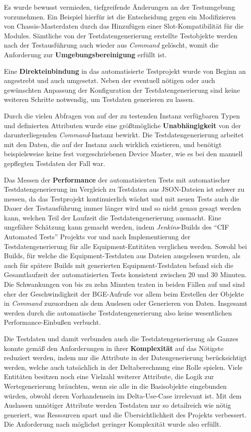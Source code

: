 Es wurde bewusst vermieden, tiefgreifende Änderungen an der Testumgebung vorzunehmen. Ein Beispiel hierfür ist die Entscheidung gegen ein Modifizieren von Chassis-Masterdaten durch das Hinzufügen einer Slot-Kompatibilität für die Modules. Sämtliche von der Testdatengenerierung erstellte Testobjekte werden nach der Testausführung auch wieder aus \textit{Command} gelöscht, womit die Anforderung zur \textbf{Umgebungsbereinigung} erfüllt ist.

Eine \textbf{Direkteinbindung} in das automatisierte Testprojekt wurde von Beginn an angestrebt und auch umgesetzt. Neben der eventuell nötigen oder auch gewünschten Anpassung der Konfiguration der Testdatengenerierung sind keine weiteren Schritte notwendig, um Testdaten generieren zu lassen.

Durch die vielen Abfragen von auf der zu testenden Instanz verfügbaren Typen und definierten Attributen wurde eine größtmögliche \textbf{Unabhängigkeit} von der darunterliegenden \textit{Command}-Instanz bewirkt. Die Testdatengenerierung arbeitet mit den Daten, die auf der Instanz auch wirklich existieren, und benötigt beispielsweise keine fest vorgeschriebenen Device Master, wie es bei den manuell gepflegten Testdaten der Fall war.

Das Messen der \textbf{Performance} der automatisierten Tests mit automatischer Testdatengenerierung im Vergleich zu Testdaten aus \ac{JSON}-Dateien ist schwer zu messen, da das Testprojekt kontinuierlich wächst und mit neuen Tests auch die Dauer der Testausführung immer länger wird und so nicht genau gesagt werden kann, welchen Teil der Laufzeit die Testdatengenerierung ausmacht. Eine ungefähre Schätzung kann gemacht werden, indem \textit{Jenkins}-Builds des \enquote{\ac{CIF} Automated Tests} Projekts vor und nach Implementierung der Testdatengenerierung für alle Equipment-Entitäten verglichen werden. Sowohl bei Builds, für welche die Equipment-Testdaten aus Dateien ausgelesen wurden, als auch für spätere Builds mit generierten Equipment-Testdaten befand sich die Gesamtlaufzeit der automatisierten Tests konsistent zwischen 20 und 30 Minuten. Die Schwankungen von bis zu zehn Minuten traten in beiden Fällen auf und sind eher der Geschwindigkeit der \ac{BGE}-Aufrufe vor allem beim Erstellen der Objekte in \textit{Command} zuzuordnen als dem Auslesen oder Generieren von Daten. Insgesamt werden durch die automatische Testdatengenerierung also keine wesentlichen Performance-Einbußen verbucht.

Die Testdaten und damit verbunden auch die Testdatengenerierung als Ganzes konnte gemäß den Anforderungen in ihrer \textbf{Komplexität} auf das Nötigste reduziert werden, indem nur die Attribute in der Datengenerierung berücksichtigt werden, welche auch tatsächlich in der Deltaberechnung eine Rolle spielen. Viele Entitäten besitzen noch eine Vielzahl weiterer Attribute, die Logik zur Wertegenerierung bräuchten, wenn sie alle in die Basisobjekte eingebunden würden, obwohl deren Vorhandensein im Delta-Use-Case irrelevant ist. Mit dem Auslassen unnötiger Attribute werden Testdaten nur so detailreich wie nötig generiert, was Ressourcen spart und die Übersichtlichkeit des Projekts verbessert. Die Anforderung nach möglichst geringer Komplexität wurde also erfüllt.

